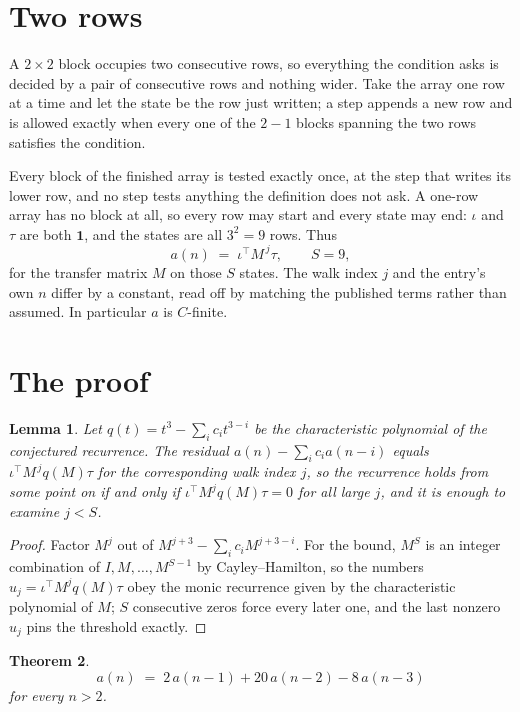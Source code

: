 \documentclass[11pt,a4paper]{article}
\theoremstyle{plain}
\newtheorem{theorem}{Theorem}
\newtheorem{lemma}[theorem]{Lemma}
\theoremstyle{definition}
\begin{document}
\section{Two rows}

A $2\times2$ block occupies two consecutive rows, so everything the condition asks is decided
by a pair of consecutive rows and nothing wider. Take the array one row at a time and let the
state be the row just written; a step appends a new row and is allowed exactly when every one
of the $2-1$ blocks spanning the two rows satisfies the condition.

Every block of the finished array is tested exactly once, at the step that writes its lower
row, and no step tests anything the definition does not ask. A one-row array has no block at
all, so every row may start and every state may end: $\iota$ and $\tau$ are both
$\mathbf{1}$, and the states are all $3^{2}=9$ rows. Thus
\[
a(n)\;=\;\iota^{\!\top}M^{\,j}\tau ,\qquad S=9,
\]
for the transfer matrix $M$ on those $S$ states. The walk index $j$ and the entry's own $n$
differ by a constant, read off by matching the published terms rather than assumed. In
particular $a$ is $C$-finite.

\section{The proof}

\begin{lemma}\label{lem:crit}
Let $q(t)=t^{3}-\sum_i c_it^{3-i}$ be the characteristic polynomial of the
conjectured recurrence. The residual $a(n)-\sum_ic_ia(n-i)$ equals
$\iota^{\!\top}M^{\,j}q(M)\tau$ for the corresponding walk index $j$, so the recurrence
holds from some point on if and only if $\iota^{\!\top}M^{j}q(M)\tau=0$ for all large $j$,
and it is enough to examine $j<S$.
\end{lemma}

\begin{proof}
Factor $M^{j}$ out of $M^{j+3}-\sum_ic_iM^{j+3-i}$. For the bound, $M^{S}$
is an integer combination of $I,M,\dots,M^{S-1}$ by Cayley--Hamilton, so the numbers
$u_j=\iota^{\!\top}M^{j}q(M)\tau$ obey the monic recurrence given by the characteristic
polynomial of $M$; $S$ consecutive zeros force every later one, and the last nonzero $u_j$
pins the threshold exactly.
\end{proof}

\begin{theorem}
\[
a(n)\;=\;2\,a(n-1) + 20\,a(n-2) - 8\,a(n-3)
\]
for every $n>2$.
\end{theorem}
\end{document}
